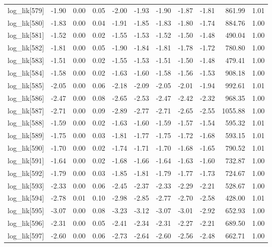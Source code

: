 \begin{table}[ht]
\begin{tabular}{rrrrrrrrrrr}
  log\_lik[579] & -1.90 & 0.00 & 0.05 & -2.00 & -1.93 & -1.90 & -1.87 & -1.81 & 861.99 & 1.01 \\ 
  log\_lik[580] & -1.83 & 0.00 & 0.04 & -1.91 & -1.85 & -1.83 & -1.80 & -1.74 & 884.76 & 1.00 \\ 
  log\_lik[581] & -1.52 & 0.00 & 0.02 & -1.55 & -1.53 & -1.52 & -1.50 & -1.48 & 490.04 & 1.00 \\ 
  log\_lik[582] & -1.81 & 0.00 & 0.05 & -1.90 & -1.84 & -1.81 & -1.78 & -1.72 & 780.80 & 1.00 \\ 
  log\_lik[583] & -1.51 & 0.00 & 0.02 & -1.55 & -1.53 & -1.51 & -1.50 & -1.48 & 479.41 & 1.00 \\ 
  log\_lik[584] & -1.58 & 0.00 & 0.02 & -1.63 & -1.60 & -1.58 & -1.56 & -1.53 & 908.18 & 1.00 \\ 
  log\_lik[585] & -2.05 & 0.00 & 0.06 & -2.18 & -2.09 & -2.05 & -2.01 & -1.94 & 992.61 & 1.01 \\ 
  log\_lik[586] & -2.47 & 0.00 & 0.08 & -2.65 & -2.53 & -2.47 & -2.42 & -2.32 & 968.35 & 1.00 \\ 
  log\_lik[587] & -2.71 & 0.00 & 0.09 & -2.89 & -2.77 & -2.71 & -2.65 & -2.55 & 1055.88 & 1.00 \\ 
  log\_lik[588] & -1.59 & 0.00 & 0.02 & -1.63 & -1.60 & -1.59 & -1.57 & -1.54 & 595.32 & 1.01 \\ 
  log\_lik[589] & -1.75 & 0.00 & 0.03 & -1.81 & -1.77 & -1.75 & -1.72 & -1.68 & 593.15 & 1.01 \\ 
  log\_lik[590] & -1.70 & 0.00 & 0.02 & -1.74 & -1.71 & -1.70 & -1.68 & -1.65 & 790.52 & 1.01 \\ 
  log\_lik[591] & -1.64 & 0.00 & 0.02 & -1.68 & -1.66 & -1.64 & -1.63 & -1.60 & 732.87 & 1.00 \\ 
  log\_lik[592] & -1.79 & 0.00 & 0.03 & -1.85 & -1.81 & -1.79 & -1.77 & -1.73 & 724.67 & 1.00 \\ 
  log\_lik[593] & -2.33 & 0.00 & 0.06 & -2.45 & -2.37 & -2.33 & -2.29 & -2.21 & 528.67 & 1.00 \\ 
  log\_lik[594] & -2.78 & 0.01 & 0.10 & -2.98 & -2.85 & -2.77 & -2.70 & -2.58 & 428.00 & 1.01 \\ 
  log\_lik[595] & -3.07 & 0.00 & 0.08 & -3.23 & -3.12 & -3.07 & -3.01 & -2.92 & 652.93 & 1.00 \\ 
  log\_lik[596] & -2.31 & 0.00 & 0.05 & -2.41 & -2.34 & -2.31 & -2.27 & -2.21 & 689.50 & 1.00 \\ 
  log\_lik[597] & -2.60 & 0.00 & 0.06 & -2.73 & -2.64 & -2.60 & -2.56 & -2.48 & 662.71 & 1.00 \\ 

\end{tabular}
\end{table}
